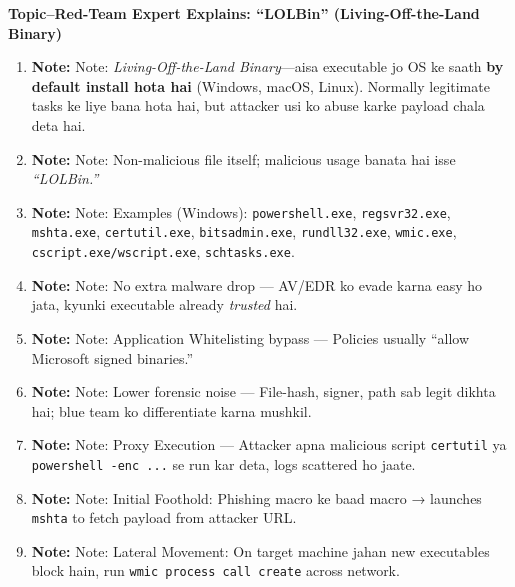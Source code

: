 \documentclass[a4paper,12pt]{article}
\begin{document}
\begin{center}
    \Huge\bfseries\color{titleblue}Topic--Red-Team Expert Explains: “LOLBin” (Living-Off-the-Land Binary)
\end{center}

\vspace{1em}

\begin{enumerate}[leftmargin=*,itemsep=0.5em]

\item \textbf{Note:}\color{notered} Note: \color{black} \textit{Living-Off-the-Land Binary}—aisa executable jo OS ke saath \textbf{by default install hota hai} (Windows, macOS, Linux). Normally legitimate tasks ke liye bana hota hai, but attacker usi ko abuse karke payload chala deta hai.
\item \textbf{Note:}\color{notered} Note: \color{black} Non-malicious file itself; malicious usage banata hai isse \textit{“LOLBin.”}
\item \textbf{Note:}\color{notered} Note: \color{black} Examples (Windows): \texttt{powershell.exe}, \texttt{regsvr32.exe}, \texttt{mshta.exe}, \texttt{certutil.exe}, \texttt{bitsadmin.exe}, \texttt{rundll32.exe}, \texttt{wmic.exe}, \texttt{cscript.exe/wscript.exe}, \texttt{schtasks.exe}.
\item \textbf{Note:}\color{notered} Note: \color{black} No extra malware drop — AV/EDR ko evade karna easy ho jata, kyunki executable already \textit{trusted} hai.
\item \textbf{Note:}\color{notered} Note: \color{black} Application Whitelisting bypass — Policies usually “allow Microsoft signed binaries.”
\item \textbf{Note:}\color{notered} Note: \color{black} Lower forensic noise — File-hash, signer, path sab legit dikhta hai; blue team ko differentiate karna mushkil.
\item \textbf{Note:}\color{notered} Note: \color{black} Proxy Execution — Attacker apna malicious script \texttt{certutil} ya \texttt{powershell -enc ...} se run kar deta, logs scattered ho jaate.
\item \textbf{Note:}\color{notered} Note: \color{black} Initial Foothold: Phishing macro ke baad macro → launches \texttt{mshta} to fetch payload from attacker URL.
\item \textbf{Note:}\color{notered} Note: \color{black} Lateral Movement: On target machine jahan new executables block hain, run \texttt{wmic process call create} across network.
\begin{tcolorbox}[colback=codebg, boxrule=0.5pt, arc=4pt, boxsep=5pt]

\end{tcolorbox}
\end{enumerate}
\end{document}
